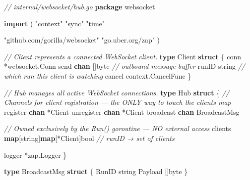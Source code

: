\documentclass[
]{article}
\newenvironment{Shaded}{}{}
\newcommand{\CommentTok}[1]{\textcolor[rgb]{0.38,0.63,0.69}{\textit{#1}}}
\newcommand{\DataTypeTok}[1]{\textcolor[rgb]{0.56,0.13,0.00}{#1}}
\newcommand{\KeywordTok}[1]{\textcolor[rgb]{0.00,0.44,0.13}{\textbf{#1}}}
\newcommand{\NormalTok}[1]{#1}
\newcommand{\OperatorTok}[1]{\textcolor[rgb]{0.40,0.40,0.40}{#1}}
\newcommand{\StringTok}[1]{\textcolor[rgb]{0.25,0.44,0.63}{#1}}
\begin{document}
\begin{Shaded}
\begin{Highlighting}[]
\CommentTok{// internal/websocket/hub.go}
\KeywordTok{package}\NormalTok{ websocket}

\KeywordTok{import} \OperatorTok{(}
    \StringTok{"context"}
    \StringTok{"sync"}
    \StringTok{"time"}

    \StringTok{"github.com/gorilla/websocket"}
    \StringTok{"go.uber.org/zap"}
\OperatorTok{)}

\CommentTok{// Client represents a connected WebSocket client.}
\KeywordTok{type}\NormalTok{ Client }\KeywordTok{struct} \OperatorTok{\{}
\NormalTok{    conn   }\OperatorTok{*}\NormalTok{websocket}\OperatorTok{.}\NormalTok{Conn}
\NormalTok{    send   }\KeywordTok{chan} \OperatorTok{[]}\DataTypeTok{byte}     \CommentTok{// outbound message buffer}
\NormalTok{    runID  }\DataTypeTok{string}          \CommentTok{// which run this client is watching}
\NormalTok{    cancel context}\OperatorTok{.}\NormalTok{CancelFunc}
\OperatorTok{\}}

\CommentTok{// Hub manages all active WebSocket connections.}
\KeywordTok{type}\NormalTok{ Hub }\KeywordTok{struct} \OperatorTok{\{}
    \CommentTok{// Channels for client registration — the ONLY way to touch the clients map}
\NormalTok{    register   }\KeywordTok{chan} \OperatorTok{*}\NormalTok{Client}
\NormalTok{    unregister }\KeywordTok{chan} \OperatorTok{*}\NormalTok{Client}
\NormalTok{    broadcast  }\KeywordTok{chan}\NormalTok{ BroadcastMsg}

    \CommentTok{// Owned exclusively by the Run() goroutine — NO external access}
\NormalTok{    clients }\KeywordTok{map}\OperatorTok{[}\DataTypeTok{string}\OperatorTok{]}\KeywordTok{map}\OperatorTok{[*}\NormalTok{Client}\OperatorTok{]}\DataTypeTok{bool} \CommentTok{// runID → set of clients}

\NormalTok{    logger }\OperatorTok{*}\NormalTok{zap}\OperatorTok{.}\NormalTok{Logger}
\OperatorTok{\}}

\KeywordTok{type}\NormalTok{ BroadcastMsg }\KeywordTok{struct} \OperatorTok{\{}
\NormalTok{    RunID   }\DataTypeTok{string}
\NormalTok{    Payload }\OperatorTok{[]}\DataTypeTok{byte}
\OperatorTok{\}}


\end{Highlighting}
\end{Shaded}
\end{document}
